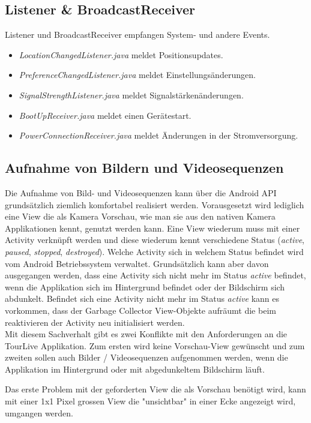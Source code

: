 \subsection{Listener \& BroadcastReceiver}
Listener und BroadcastReceiver empfangen System- und andere Events. 
\begin{itemize} [noitemsep,topsep=0pt]
	\item \textit{LocationChangedListener.java} meldet Positionsupdates.
	\item \textit{PreferenceChangedListener.java} meldet Einstellungsänderungen.
	\item \textit{SignalStrengthListener.java} meldet Signalstärkenänderungen.
	\item \textit{BootUpReceiver.java} meldet einen Gerätestart.
	\item \textit{PowerConnectionReceiver.java} meldet Änderungen in der Stromversorgung.
\end{itemize}

\subsection{Aufnahme von Bildern und Videosequenzen}
Die Aufnahme von Bild- und Videosequenzen kann über die Android API grundsätzlich ziemlich komfortabel realisiert werden. Vorausgesetzt wird lediglich eine View die als Kamera Vorschau, wie man sie aus den nativen Kamera Applikationen kennt, genutzt werden kann. Eine View wiederum muss mit einer Activity verknüpft werden und diese wiederum kennt verschiedene Status (\textit{active}, \textit{paused}, \textit{stopped}, \textit{destroyed}). Welche Activity sich in welchem Status befindet wird vom Android Betriebssystem verwaltet. Grundsätzlich kann aber davon ausgegangen werden, dass eine Activity sich nicht mehr im Status \textit{active} befindet, wenn die Applikation sich im Hintergrund befindet oder der Bildschirm sich abdunkelt. Befindet sich eine Activity nicht mehr im Status \textit{active} kann es vorkommen, dass der Garbage Collector View-Objekte aufräumt die beim reaktivieren der Activity neu initialisiert werden.
\\

Mit diesem Sachverhalt gibt es zwei Konflikte mit den Anforderungen an die TourLive Applikation. Zum ersten wird keine Vorschau-View gewünscht und zum zweiten sollen auch Bilder / Videosequenzen aufgenommen werden, wenn die Applikation im Hintergrund oder mit abgedunkeltem Bildschirm läuft. 

Das erste Problem mit der geforderten View die als Vorschau benötigt wird,  kann mit einer 1x1 Pixel grossen View die "unsichtbar" in einer Ecke angezeigt wird, umgangen werden. 

